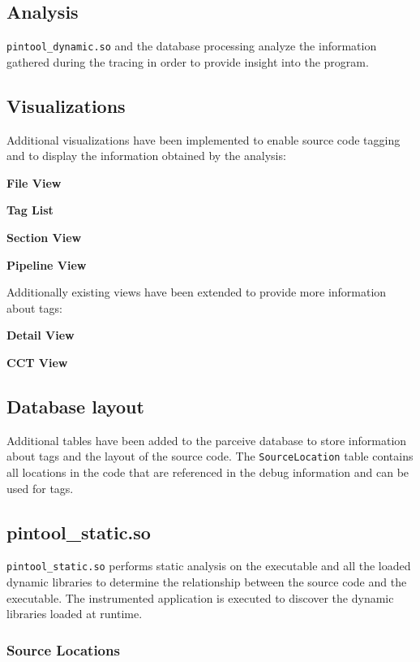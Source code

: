 \subsection{Analysis}

\texttt{pintool\_dynamic.so} and the database processing analyze the information gathered during the tracing in order to provide insight into the program. 

\subsection{Visualizations}

Additional visualizations have been implemented to enable source code tagging and to display the information obtained by the analysis:

\textbf{File View}

\textbf{Tag List}

\textbf{Section View}

\textbf{Pipeline View}

Additionally existing views have been extended to provide more information about tags:

\textbf{Detail View}

\textbf{CCT View}

\subsection{Database layout}

Additional tables have been added to the parceive database to store information about tags and the layout of the source code. The \texttt{SourceLocation} table contains all locations in the code that are referenced in the debug information and can be used for tags.

\subsection{pintool\_static.so}

\texttt{pintool\_static.so} performs static analysis on the executable and all the loaded dynamic libraries to determine the relationship between the source code and the executable. The instrumented application is executed to discover the dynamic libraries loaded at runtime.

\subsubsection{Source Locations}

